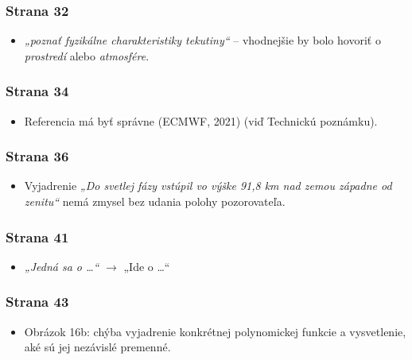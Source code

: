 \hypertarget{strana-32}{%
\subsubsection{Strana 32}\label{strana-32}}

\begin{itemize}
\tightlist
\item
  \emph{„poznať fyzikálne charakteristiky tekutiny“} -- vhodnejšie by
  bolo hovoriť o \emph{prostredí} alebo \emph{atmosfére}.
\end{itemize}

\hypertarget{strana-34}{%
\subsubsection{Strana 34}\label{strana-34}}

\begin{itemize}
\tightlist
\item
  Referencia má byť správne (ECMWF, 2021) (viď Technickú poznámku).
\end{itemize}

\hypertarget{strana-36}{%
\subsubsection{Strana 36}\label{strana-36}}

\begin{itemize}
\tightlist
\item
  Vyjadrenie \emph{„Do svetlej fázy vstúpil vo výške 91,8 km nad zemou
  západne od zenitu“} nemá zmysel bez udania polohy pozorovateľa.
\end{itemize}

\hypertarget{strana-41}{%
\subsubsection{Strana 41}\label{strana-41}}

\begin{itemize}
\tightlist
\item
  \emph{„Jedná sa o \ldots{}“} \(\rightarrow\) „Ide o \ldots{}“
\end{itemize}

\hypertarget{strana-43}{%
\subsubsection{Strana 43}\label{strana-43}}

\begin{itemize}
\tightlist
\item
  Obrázok 16b: chýba vyjadrenie konkrétnej polynomickej funkcie a
  vysvetlenie, aké sú jej nezávislé premenné.
\end{itemize}

